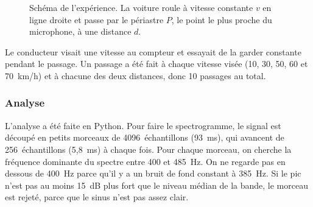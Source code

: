 \documentclass[11pt,letterpaper]{article}
\begin{document}
\begin{figure}[htbp]
    \centering
    \caption{Schéma de l'expérience. La voiture roule à vitesse constante $v$ en ligne droite et passe par le périastre $P$, le point le plus proche du microphone, à une distance $d$.}
    \label{fig:schema}
\end{figure}

Le conducteur visait une vitesse au compteur et essayait de la garder constante pendant le passage. Un passage a été fait à chaque vitesse visée (10, 30, 50, 60 et 70~km/h) et à chacune des deux distances, donc 10 passages au total.

\subsubsection*{Analyse}
L'analyse a été faite en Python. Pour faire le spectrogramme, le signal est découpé en petits morceaux de 4096~échantillons (93~ms), qui avancent de 256~échantillons (5,8~ms) à chaque fois. Pour chaque morceau, on cherche la fréquence dominante du spectre entre 400 et 485~Hz. On ne regarde pas en dessous de 400~Hz parce qu'il y a un bruit de fond constant à 385~Hz. Si le pic n'est pas au moins 15~dB plus fort que le niveau médian de la bande, le morceau est rejeté, parce que le sinus n'est pas assez clair.
\end{document}
